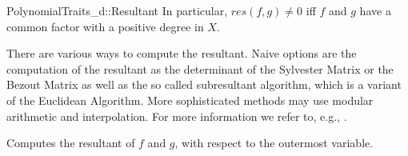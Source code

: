 \begin{ccRefConcept}{PolynomialTraits_d::Resultant}
In particular, $res(f,g) \neq 0$ iff $f$ and $g$ have a common factor with a 
positive degree in $X$. %

There are various ways to compute the resultant. 
Naive options are the computation of the resultant as the determinant of 
the Sylvester Matrix or the Bezout 
Matrix as well as the so called subresultant algorithm, 
which is a variant of the Euclidean Algorithm. 
More sophisticated methods may use modular arithmetic and interpolation. 
For more information we refer to, e.g., \cite{gg-mca-99}. 

\ccRefines 
{}

\ccTypes
{}
\ccGlue
{}
\ccGlue
{}

\ccOperations
{}
         { Computes the resultant of $f$ and $g$, 
           with respect to the outermost variable.}



\ccSeeAlso

\\
\\
\\

\end{ccRefConcept}
